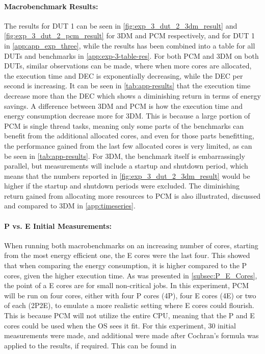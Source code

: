 


\paragraph*{Macrobenchmark Results:} The results for DUT 1 can be seen in \cref{fig:exp_3_dut_2_3dm_result} and \cref{fig:exp_3_dut_2_pcm_result} for 3DM and PCM respectively, and for DUT 1 in \cref{app:app_exp_three}, while the results has been combined into a table for all DUTs and benchmarks in \cref{app:exp-3-table-res}. For both PCM and 3DM on both DUTs, similar observations can be made, where when more cores are allocated, the execution time and DEC is exponentially decreasing, while the DEC per second is increasing. It can be seen in \cref{tab:app-results} that the execution time decrease more than the DEC which shows a diminishing return in terms of energy savings. A difference between 3DM and PCM is how the execution time and energy consumption decrease more for 3DM. This is because a large portion of PCM is single thread tasks, meaning only some parts of the benchmarks can benefit from the additional allocated cores, and even for those parts benefitting, the performance gained from the last few allocated cores is very limited, as can be seen in \cref{tab:app-results}.  For 3DM, the benchmark itself is embarrassingly parallel, but measurements will include a startup and shutdown period, which means that the numbers reported in \cref{fig:exp_3_dut_2_3dm_result} would be higher if the startup and shutdown periods were excluded. The diminishing return gained from allocating more resources to PCM is also illustrated, discussed and compared to 3DM in \cref{app:timeseries}.

\paragraph{P vs. E Initial Measurements:} When running both macrobenchmarks on an increasing number of cores, starting from the most energy efficient one, the E cores were the last four. This showed that when comparing the energy consumption, it is higher compared to the P cores, given the higher execution time. As was presented in \cref{subsec:P_E_Cores}, the point of a E cores are for small non-critical jobs. In this experiment, PCM will be run on four cores, either with four P cores (4P), four E cores (4E) or two of each (2P2E), to emulate a more realistic setting where E cores could flourish. This is because PCM will not utilize the entire CPU, meaning that the P and E cores could be used when the OS sees it fit. For this experiment, $30$ initial measurements were made, and additional were made after Cochran's formula was applied to the results, if required. This can be found in 

